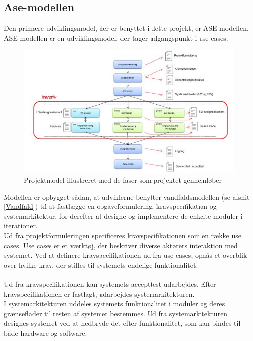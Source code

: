 \subsection{Ase-modellen}
Den primære udviklingsmodel, der er benyttet i dette projekt, er ASE modellen. ASE modellen er en udviklingsmodel, der tager udgangspunkt i use cases. 
\begin{figure}[H]
	\centering
	\includegraphics[width=1\textwidth]{Figurer/Metode/ASEmodellen}
	\caption{Projektmodel illustreret med de faser som projektet gennemløber\protect\footnotemark}
	\label{ASEmodel}
\end{figure}


Modellen er opbygget sådan, at udviklerne benytter vandfaldsmodellen (se afsnit \ref{Vandfald}) til at fastlægge en opgaveformulering, kravspecifikation og systemarkitektur, for derefter at designe og implementere de enkelte moduler i iterationer. \\ Ud fra projektformuleringen specificeres kravspecifikationen som en række use cases. Use cases er et værktøj, der beskriver diverse aktørers interaktion med systemet. Ved at definere kravspecifikationen ud fra use cases, opnås et overblik over hvilke krav, der stilles til systemets endelige funktionalitet.\\ \\ Ud fra kravspecifikationen kan systemets accepttest udarbejdes. Efter kravspecifikationen er fastlagt, udarbejdes systemarkitekturen.\\ I systemarkitekturen uddeles systemets funktionalitet i moduler og deres grænseflader til resten af systemet bestemmes. Ud fra systemarkitekturen designes systemet ved at nedbryde det efter funktionalitet, som kan bindes til både hardware og software.
